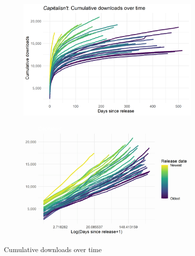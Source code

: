 \documentclass[11pt, letterpaper, twoside]{article}
\begin{document}
\begin{figure}[h]
    \centering
    \begin{subfigure}[h]{0.49\textwidth}
        \centering
        \includegraphics[width=\textwidth]{cumulative_downloads_since_release.png}
        \caption{}
    \end{subfigure}
    \hfill
    \begin{subfigure}[h]{0.49\textwidth}
        \centering
        \includegraphics[width=\textwidth]{cumulative_downloads_since_release_log.png}
        \caption{}
    \end{subfigure}
    \caption{Cumulative downloads over time}
\end{figure}
\end{document}
